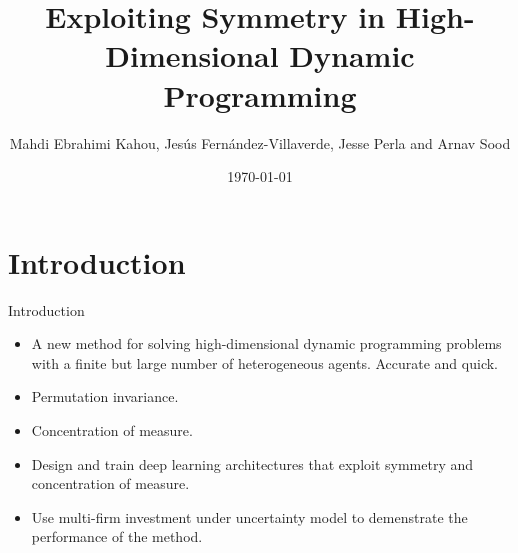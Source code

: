 \documentclass[dvipsnames,mathserif]{beamer}
\begin{document}
\rightskip\rightmargin
\title{Exploiting Symmetry in High-Dimensional Dynamic Programming}
\author{Mahdi Ebrahimi Kahou, Jesús Fernández-Villaverde, Jesse Perla and Arnav Sood}

\footnotesize{\date{\today }


\begin{frame}
\maketitle
\end{frame}


%
\footnotesize \tableofcontents
%
\section{Introduction}
\begin{frame}{Introduction}
    \begin{itemize}
        \item A new method for solving high-dimensional dynamic programming problems with a finite but large number of heterogeneous agents. Accurate and quick.\\
        \vspace{0.2cm}
        \item Permutation invariance.
        \vspace{0.2cm}
        \item Concentration of measure.
        \vspace{0.2cm}
        \item Design and train deep learning architectures that exploit symmetry and concentration of measure.
        \item Use multi-firm investment under uncertainty model to demenstrate the performance of the method. 
    \end{itemize}
\end{frame}


}
\end{document}

